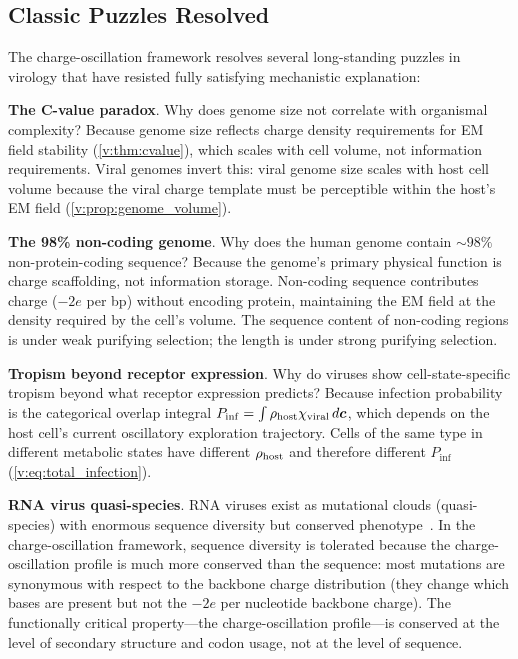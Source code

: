 \subsection{Classic Puzzles Resolved}

The charge-oscillation framework resolves several long-standing puzzles in virology that have resisted fully satisfying mechanistic explanation:

\textbf{The C-value paradox}. Why does genome size not correlate with organismal complexity? Because genome size reflects charge density requirements for EM field stability (\cref{v:thm:cvalue}), which scales with cell volume, not information requirements. Viral genomes invert this: viral genome size scales with host cell volume because the viral charge template must be perceptible within the host's EM field (\cref{v:prop:genome_volume}).

\textbf{The 98\% non-coding genome}. Why does the human genome contain $\sim\!98\%$ non-protein-coding sequence? Because the genome's primary physical function is charge scaffolding, not information storage. Non-coding sequence contributes charge ($-2e$ per bp) without encoding protein, maintaining the EM field at the density required by the cell's volume. The sequence content of non-coding regions is under weak purifying selection; the length is under strong purifying selection.

\textbf{Tropism beyond receptor expression}. Why do viruses show cell-state-specific tropism beyond what receptor expression predicts? Because infection probability is the categorical overlap integral $P_{\mathrm{inf}} = \int \rho_{\mathrm{host}} \chi_{\mathrm{viral}}\,d\boldsymbol{c}$, which depends on the host cell's current oscillatory exploration trajectory. Cells of the same type in different metabolic states have different $\rho_{\mathrm{host}}$ and therefore different $P_{\mathrm{inf}}$ (\cref{v:eq:total_infection}).

\textbf{RNA virus quasi-species}. RNA viruses exist as mutational clouds (quasi-species) with enormous sequence diversity but conserved phenotype~\cite{Domingo2012}. In the charge-oscillation framework, sequence diversity is tolerated because the charge-oscillation profile is much more conserved than the sequence: most mutations are synonymous with respect to the backbone charge distribution (they change which bases are present but not the $-2e$ per nucleotide backbone charge). The functionally critical property---the charge-oscillation profile---is conserved at the level of secondary structure and codon usage, not at the level of sequence.

